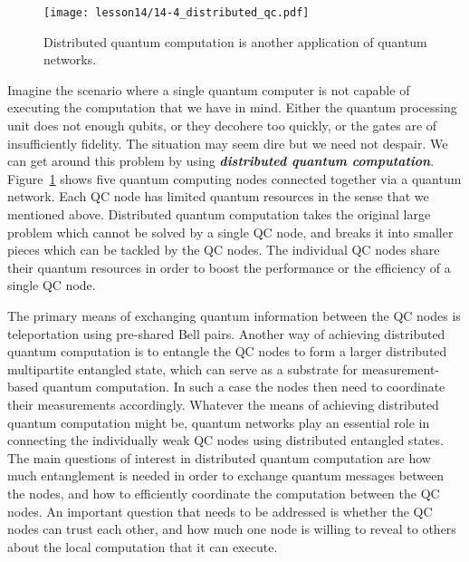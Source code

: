 \begin{figure}[t]
    \centering
    \texttt{[image: lesson14/14-4\_distributed\_qc.pdf]}
    \caption[Distributed quantum computation.]{Distributed quantum computation is another application of quantum networks.}
    \label{fig:14-4_distributed_qc}
\end{figure}

Imagine the scenario where a single quantum computer is not capable of executing the computation that we have in mind.
Either the quantum processing unit does not enough qubits, or they decohere too quickly, or the gates are of insufficiently fidelity.
The situation may seem dire but we need not despair.
We can get around this problem by using \textbf{\textit{distributed quantum computation}}.
Figure~\ref{fig:14-4_distributed_qc} shows five quantum computing nodes connected together via a quantum network.
Each QC node has limited quantum resources in the sense that we mentioned above.
Distributed quantum computation takes the original large problem which cannot be solved by a single QC node, and breaks it into smaller pieces which can be tackled by the QC nodes.
The individual QC nodes share their quantum resources in order to boost the performance or the efficiency of a single QC node.

The primary means of exchanging quantum information between the QC nodes is teleportation using pre-shared Bell pairs.
Another way of achieving distributed quantum computation is to entangle the QC nodes to form a larger distributed multipartite entangled state, which can serve as a substrate for measurement-based quantum computation.
In such a case the nodes then need to coordinate their measurements accordingly.
Whatever the means of achieving distributed quantum computation might be, quantum networks play an essential role in connecting the individually weak QC nodes using distributed entangled states.
The main questions of interest in distributed quantum computation are how much entanglement is needed in order to exchange quantum messages between the nodes, and how to efficiently coordinate the computation between the QC nodes.
An important question that needs to be addressed is whether the QC nodes can trust each other, and how much one node is willing to reveal to others about the local computation that it can execute.

